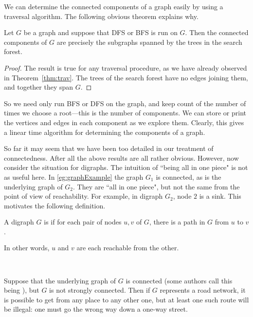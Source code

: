 We can determine the connected components of a graph easily by using a
traversal algorithm. The following obvious theorem explains why.

\begin{Theorem}
\label{thm:trav-comps}
Let $G$ be a graph and suppose that DFS or BFS is run on $G$. Then the
connected components of $G$ are precisely the subgraphs spanned by the
trees in the search forest. 
\end{Theorem}

\begin{proof}
The result is true for any traversal procedure, as we have already observed in 
Theorem~\ref{thm:trav}. The trees of the search forest have no edges joining 
them, and together they span $G$.
\end{proof}

So we need only run BFS or DFS on the graph, and keep count
of the number of times we choose a root---this is the number of
components. We can store or print the vertices and edges in each
component as we explore them. Clearly, this gives a linear time algorithm
for determining the components of a graph.

So far it may seem that we have been too detailed in our treatment of 
connectedness. After all the above results are all rather obvious.
However, now consider the situation for digraphs. The intuition of ``being all 
in one piece" is not as useful here. In
\cref{eg:graphExample} the graph $G_1$ is connected, as is the
underlying graph of $G_2$. They are ``all in one piece", but not the
same from the point of view of reachability. For example, in digraph
$G_2$, node $2$ is a sink. This motivates the following definition.

\begin{Definition}
A digraph $G$ is  if for each pair of nodes $u, v$ 
of $G$, there is a path in $G$ from $u$ to $v$.
\end{Definition}

\begin{note}
In other words, $u$ and $v$ are each reachable from the other.

\

Suppose that the underlying graph of $G$ is connected (some authors call
this being ), but $G$ is not strongly
connected. Then if $G$ represents a road network, it is possible to get
from any place to any other one, but at least one such route will be
illegal: one must go the wrong way down a one-way street. 
\end{note}


